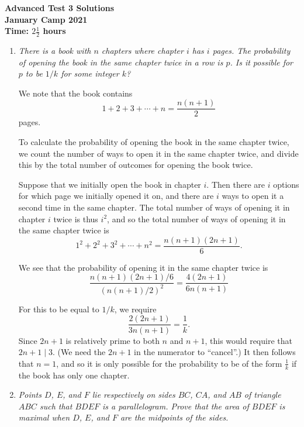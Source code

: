 \documentclass{article}
\begin{document}
\thispagestyle{empty}

\begin{center}
  \textbf{\Large Advanced Test 3 Solutions}
  \\ \vspace{1em}
  \textbf{\large January Camp 2021}
  \\ \vspace{1em}
  \textbf{\large Time: $2\frac{1}{2}$ hours}
\end{center}

\vspace{12pt}

\begin{enumerate}[1.]

\item %
{\itshape There is a book with $n$ chapters where chapter $i$ has $i$ pages.
The probability of opening the book in the same chapter twice in a row is $p$.
Is it possible for $p$ to be $1/k$ for some integer $k$?}

We note that the book contains
\[
  1 + 2 + 3 + \dotsb + n = \frac{n(n + 1)}{2}  
\]
pages.

To calculate the probability of opening the book in the same chapter twice, we count the number of ways to open it in the same chapter twice, and divide this by the total number of outcomes for opening the book twice.

Suppose that we initially open the book in chapter $i$. Then there are $i$ options for which page we initially opened it on, and there are $i$ ways to open it a second time in the same chapter. The total number of ways of opening it in chapter $i$ twice is thus $i^2$, and so the total number of ways of opening it in the same chapter twice is
\[
  1^2 + 2^2 + 3^2 + \dotsb + n^2 = \frac{n(n + 1)(2n + 1)}{6}.
\]

We see that the probability of opening it in the same chapter twice is
\[
  \frac{n(n + 1)(2n + 1)/6}{(n(n + 1)/2)^2} = \frac{4(2n + 1)}{6n(n + 1)}
\]

For this to be equal to $1/k$, we require
\[
  \frac{2(2n + 1)}{3n(n + 1)} = \frac{1}{k}.
\]
Since $2n + 1$ is relatively prime to both $n$ and $n + 1$, this would require that $2n + 1 \mid 3$. (We need the $2n + 1$ in the numerator to ``cancel''.) It then follows that $n = 1$, and so it is only possible for the probability to be of the form $\frac{1}{k}$ if the book has only one chapter.


\item %
{\itshape Points $D$, $E$, and $F$ lie respectively on sides $BC$, $CA$, and $AB$ of triangle $ABC$ such that $BDEF$ is a parallelogram. Prove that the area of $BDEF$ is maximal when $D$, $E$, and $F$ are the midpoints of the sides.}



\end{enumerate}
\end{document}
